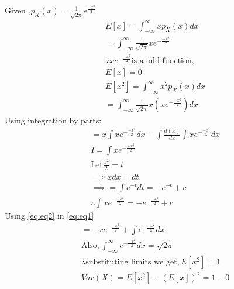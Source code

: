 \documentclass[journal,12pt,twocolumn]{IEEEtran}
\begin{document}
Given ,$p_{X}(x)=\frac{1}{\sqrt{2\pi}} e^{\frac{-x^2}{2}}$\\
\begin{align}
 &E[x]=\int_{-\infty}^{\infty} x p_{X}(x) dx\\
 &=\int_{-\infty}^{\infty} \frac{1}{\sqrt{2 \pi}} x e^{-\frac{-x^2}{2}}\\
  &\because x e^{-\frac{-x^2}{2}} \text{is a odd function},\\
  \nonumber
   &E[x]=0\\
 &E[x^2]=\int_{-\infty}^{\infty} x^2 p_{X}(x) dx\\
 &=\int_{-\infty}^{\infty} \frac{1}{\sqrt{2\pi}} x(xe^{-\frac{-x^2}{2}}) dx
\end{align}
  Using integration by parts:
  \begin{align}
   \label{eq:eq1}
 & =x\int xe^{-\frac{-x^2}{2}} dx-\int\frac{d(x)}{dx} \int xe^{-\frac{-x^2}{2}}dx\\
 &I=\int x e^{-\frac{-x^2}{2}}\\
 &\text{Let} \frac{x^2}{2}=t \\
 &\implies x dx=dt\\
 &\implies =\int e^{-t} dt=-e^{-t} +c\\
 \label{eq:eq2}
 &\therefore \int x e^{-\frac{-x^2}{2}}=-e^{-\frac{-x^2}{2}} +c
 \end{align}
 Using \eqref{eq:eq2} in \eqref{eq:eq1}\\
 \begin{align}
&= -x e^{-\frac{-x^2}{2}}+\int e^{-\frac{-x^2}{2}} dx\\
&\text{Also} ,\int_{-\infty}^{\infty} e^{-\frac{-x^2}{2}} dx=\sqrt{2 \pi} \\
&\therefore \text{substituting limits we get}, E[x^2]=1\\
 &Var(X)=E[x^2]-(E[x])^2=1-0
 \end{align}
\end{document}
